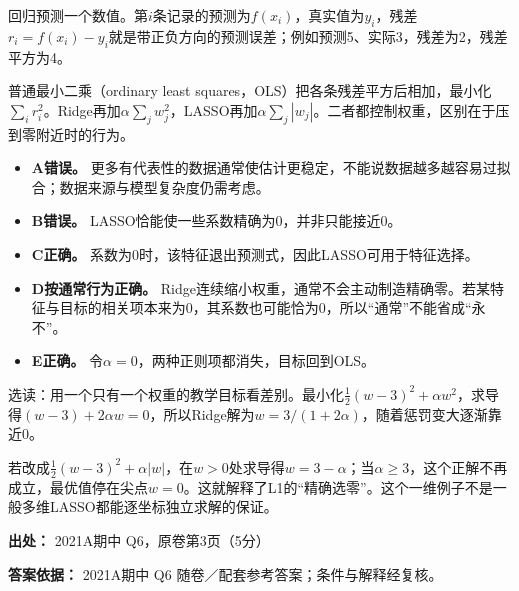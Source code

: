 回归预测一个数值。第\(i\)条记录的预测为\(f(x_i)\)，真实值为\(y_i\)，残差\(r_i=f(x_i)-y_i\)就是带正负方向的预测误差；例如预测5、实际3，残差为2，残差平方为4。


普通最小二乘（ordinary least squares，OLS）把各条残差平方后相加，最小化\(\sum_i r_i^2\)。Ridge再加\(\alpha\sum_jw_j^2\)，LASSO再加\(\alpha\sum_j|w_j|\)。二者都控制权重，区别在于压到零附近时的行为。



\begin{itemize}

\item \textbf{A错误。} 更多有代表性的数据通常使估计更稳定，不能说数据越多越容易过拟合；数据来源与模型复杂度仍需考虑。

\item \textbf{B错误。} LASSO恰能使一些系数精确为0，并非只能接近0。

\item \textbf{C正确。} 系数为0时，该特征退出预测式，因此LASSO可用于特征选择。

\item \textbf{D按通常行为正确。} Ridge连续缩小权重，通常不会主动制造精确零。若某特征与目标的相关项本来为0，其系数也可能恰为0，所以“通常”不能省成“永不”。

\item \textbf{E正确。} 令\(\alpha=0\)，两种正则项都消失，目标回到OLS。

\end{itemize}


选读：用一个只有一个权重的教学目标看差别。最小化\(\frac12(w-3)^2+\alpha w^2\)，求导得\((w-3)+2\alpha w=0\)，所以Ridge解为\(w=3/(1+2\alpha)\)，随着惩罚变大逐渐靠近0。


若改成\(\frac12(w-3)^2+\alpha|w|\)，在\(w>0\)处求导得\(w=3-\alpha\)；当\(\alpha\ge3\)，这个正解不再成立，最优值停在尖点\(w=0\)。这就解释了L1的“精确选零”。这个一维例子不是一般多维LASSO都能逐坐标独立求解的保证。


\textbf{出处：} 2021A期中 Q6，原卷第3页（5分）


\textbf{答案依据：} 2021A期中 Q6 随卷／配套参考答案；条件与解释经复核。
